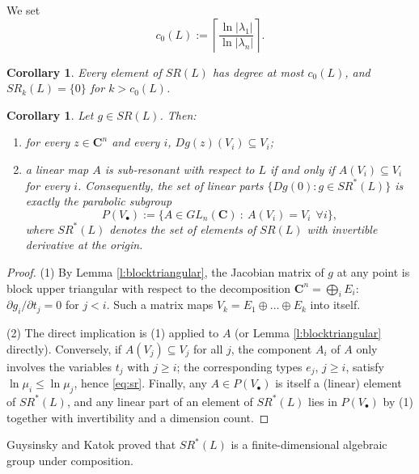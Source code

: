 \documentclass[english,11pt]{amsart}
\newtheorem{corollary}[theorem]{Corollary}
\theoremstyle{definition}
\theoremstyle{remark}
\numberwithin{equation}{section}
\newcommand{\C}{\mathbf{C}}
\begin{document}
We set
\[
c_0(L) := \left\lceil \frac{\ln |\lambda_1|}{\ln |\lambda_n|} \right\rceil .
\]

\begin{corollary}\label{c:degreebound}
Every element of $SR(L)$ has degree at most $c_0(L)$, and $SR_k(L)=\{0\}$ for $k>c_0(L)$.
\end{corollary}

\begin{corollary}\label{c:flag}
Let $g\in SR(L)$. Then:
\begin{enumerate}
\item for every $z\in\C^n$ and every $i$, $Dg(z)(V_i)\subseteq V_i$;
\item a linear map $A$ is sub-resonant with respect to $L$ if and only if $A(V_i)\subseteq V_i$ for every $i$. Consequently, the set of linear parts $\{Dg(0):g\in SR^*(L)\}$ is exactly the parabolic subgroup
\[
P(V_\bullet):=\{A\in GL_n(\C)\ :\ A(V_i)=V_i\ \ \forall i\},
\]
where $SR^*(L)$ denotes the set of elements of $SR(L)$ with invertible derivative at the origin.
\end{enumerate}
\end{corollary}

\begin{proof}
(1) By Lemma \ref{l:blocktriangular}, the Jacobian matrix of $g$ at any point is block upper triangular with respect to the decomposition $\C^n=\bigoplus_i E_i$: $\partial g_i/\partial t_j=0$ for $j<i$. Such a matrix maps $V_k=E_1\oplus\dots\oplus E_k$ into itself.

(2) The direct implication is (1) applied to $A$ (or Lemma \ref{l:blocktriangular} directly). Conversely, if $A(V_j)\subseteq V_j$ for all $j$, the component $A_i$ of $A$ only involves the variables $t_j$ with $j\ge i$; the corresponding types $e_j$, $j\ge i$, satisfy $\ln\mu_i\le\ln\mu_j$, hence \eqref{eq:sr}. Finally, any $A\in P(V_\bullet)$ is itself a (linear) element of $SR^*(L)$, and any linear part of an element of $SR^*(L)$ lies in $P(V_\bullet)$ by (1) together with invertibility and a dimension count.
\end{proof}

Guysinsky and Katok proved that $SR^*(L)$ is a finite-dimensional algebraic group under composition.
\end{document}
